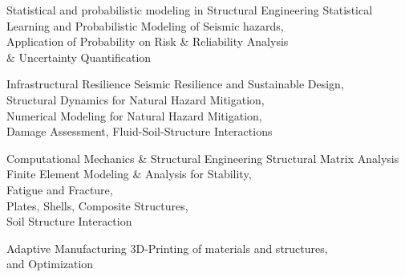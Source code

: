 

\begin{cvskills}
\vspace{7pt}
\cvskill
	{Statistical and probabilistic modeling in Structural Engineering} %
	{Statistical Learning and Probabilistic Modeling of Seismic hazards, $\hspace{2500pt}$ Application of Probability on Risk \& Reliability Analysis $\hspace{2500pt}$ \& Uncertainty Quantification} %
	
\vspace{7pt}

	
\cvskill
	{Infrastructural Resilience } %
	{Seismic Resilience and Sustainable Design, $\hspace{2500pt}$ Structural Dynamics for Natural Hazard Mitigation,  $\hspace{2500pt}$ Numerical Modeling for Natural Hazard Mitigation, $\hspace{2500pt}$ Damage Assessment, Fluid-Soil-Structure Interactions} %
	

\vspace{7pt}

\cvskill
	{Computational Mechanics \& Structural Engineering} %
	{Structural Matrix Analysis $\hspace{2500pt}$ Finite Element Modeling \& Analysis for Stability, $\hspace{2500pt}$ Fatigue and Fracture, $\hspace{2500pt}$ Plates, Shells, Composite Structures, $\hspace{2500pt}$ Soil Structure Interaction} %


\vspace{7pt}
\cvskill
	{Adaptive Manufacturing } %
	{3D-Printing of materials and structures, $\hspace{2500pt}$ and Optimization} %
	
\end{cvskills}
